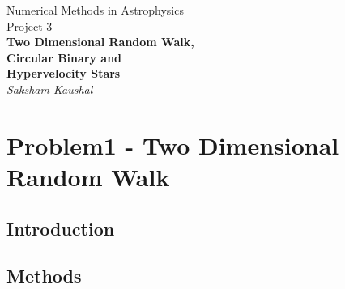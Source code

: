 \documentclass[a4paper]{article}
\begin{document}
	
	
	\begin{titlepage}
		\begin{center}
			\Large Numerical Methods in Astrophysics \\
			\vspace{1cm}
			\huge{
				Project 3 \\
				\vspace{0.5cm}
				\textbf{Two Dimensional Random Walk,}\\
				\textbf{Circular Binary and} \\
				\textbf{Hypervelocity Stars} \\
				\vspace{1cm}
			}
			\Large \emph{Saksham Kaushal}
		\end{center}
	\end{titlepage}
	
	
	\tableofcontents
	\newpage
	
	
	\section{Problem1 - Two Dimensional Random Walk} \label{Problem1}
	
		
		\subsection{Introduction} \label{1:introduction}
		
		
		\subsection{Methods} \label{1:methods}
		
		
		
		
		
		
\end{document}
